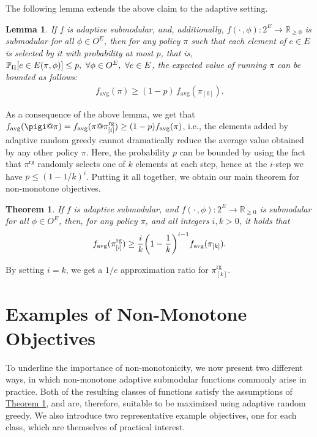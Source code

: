 \documentclass{article}
\newcommand{\theoremref}[1]{\hyperref[#1]{Theorem \ref*{#1}}}
\newtheorem{theorem}{Theorem}
\newtheorem{lemma}{Lemma}
\let\originalleft\left
\let\originalright\right
\renewcommand{\left}{\mathopen{}\mathclose\bgroup\originalleft}
\renewcommand{\right}{\aftergroup\egroup\originalright}
\newcommand{\pio}{\pi_{[0]}}
\newcommand{\pik}{\pi_{[k]}}
\newcommand{\pig}{\pi^{\textrm{rg}}}
\newcommand{\pigi}{\pi^{\textrm{rg}}_{[i]}}
\newcommand{\pigk}{\pi^{\textrm{rg}}_{[k]}}
\newcommand{\favg}{f_{\mathrm{avg}}}
\begin{document}
The following lemma extends the above claim to the adaptive setting.
\begin{lemma}
  If $f$ is adaptive submodular, and, additionally, $f(\cdot\,, \phi) : 2^E \to \mathbb{R}_{\geq 0}$ is submodular for all $\phi \in O^E$, then for any policy $\pi$ such that each element of $e \in E$ is selected by it with probability at most $p$, that is, $\P[\Pi]{e \in E(\pi, \phi)} \leq p,\ \forall \phi \in O^E,\ \forall e \in E$, the expected value of running $\pi$ can be bounded as follows:
\begin{align*}
  \favg(\pi) \geq (1-p)\,\favg(\pio).
\end{align*}
\end{lemma}

As a consequence of the above lemma, we get that $\favg(\pigi@\pi) = \favg(\pi@\pigi) \geq (1-p)\favg(\pi)$, i.e., the elements added by adaptive random greedy cannot dramatically reduce the average value obtained by any other policy $\pi$.
Here, the probability $p$ can be bounded by using the fact that $\pig$ randomly selects one of $k$ elements at each step, hence at the $i$-step we have $p \leq (1-1/k)^i$.
Putting it all together, we obtain our main theorem for non-monotone objectives.
\begin{theorem}\label{thm:nonm}
  If $f$ is adaptive submodular, and $f(\cdot\,, \phi) : 2^E \to \mathbb{R}_{\geq 0}$ is submodular for all $\phi \in O^E$, then, for any policy $\pi$, and all integers $i, k > 0$, it holds that
  \begin{align*}
    \favg(\pigi) \geq \frac{i}{k}\left(1 - \frac{1}{k}\right)^{i-1}\favg(\pik).
  \end{align*}
\end{theorem}
\noindent By setting $i = k$, we get a $1/e$ approximation ratio for $\pigk$.

\section{Examples of Non-Monotone Objectives} \label{sect:functions}
To underline the importance of non-monotonicity, we now present two different ways, in which non-monotone adaptive submodular functions commonly arise in practice.
Both of the resulting classes of functions satisfy the assumptions of \theoremref{thm:nonm}, and are, therefore, suitable to be maximized using adaptive random greedy.
We also introduce two representative example objectives, one for each class, which are themselves of practical interest.
\end{document}
